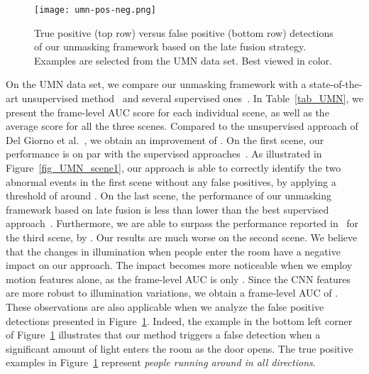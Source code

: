 \documentclass[10pt,twocolumn,letterpaper]{article}
\begin{document}
\begin{figure}
\begin{center}
\texttt{[image: umn-pos-neg.png]}
\end{center}
\vspace*{-0.3cm}
\caption{True positive (top row) versus false positive (bottom row) detections of our unmasking framework based on the late fusion strategy. Examples are selected from the UMN data set. Best viewed in color.}
\label{fig_UMN_pos_neg}
\vspace*{-0.5cm}
\end{figure}

On the UMN data set, we compare our unmasking framework with a state-of-the-art unsupervised method~\cite{Giorno-ECCV-2016} and several supervised ones~\cite{Cong-CVPR-2011,Mehran-CVPR-2009,Saligrama-CVPR-2012,Sun-PR-2017,Zhang-PR-2016}. In Table~\ref{tab_UMN}, we present the frame-level AUC score for each individual scene, as well as the average score for all the three scenes. Compared to the unsupervised approach of Del Giorno et al.~\cite{Giorno-ECCV-2016}, we obtain an improvement of . On the first scene, our performance is on par with the supervised approaches~\cite{Cong-CVPR-2011,Sun-PR-2017,Zhang-PR-2016}. As illustrated in Figure~\ref{fig_UMN_scene1}, our approach is able to correctly identify the two abnormal events in the first scene without any false positives, by applying a threshold of around . On the last scene, the performance of our unmasking framework based on late fusion is less than  lower than the best supervised approach~\cite{Sun-PR-2017}. Furthermore, we are able to surpass the performance reported in~\cite{Cong-CVPR-2011} for the third scene, by . Our results are much worse on the second scene. We believe that the changes in illumination when people enter the room have a negative impact on our approach. The impact becomes more noticeable when we employ motion features alone, as the frame-level AUC is only . Since the CNN features are more robust to illumination variations, we obtain a frame-level AUC of . These observations are also applicable when we analyze the false positive detections presented in Figure~\ref{fig_UMN_pos_neg}. Indeed, the example in the bottom left corner of Figure~\ref{fig_UMN_pos_neg} illustrates that our method triggers a false detection when a significant amount of light enters the room as the door opens. The true positive examples in Figure~\ref{fig_UMN_pos_neg} represent \emph{people running around in all directions}.
\end{document}
